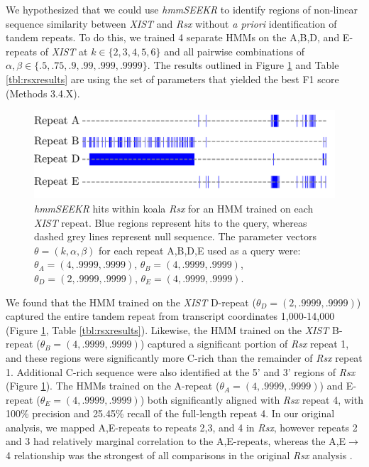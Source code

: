 We hypothesized that we could use \emph{hmmSEEKR} to identify regions of non-linear sequence similarity between \emph{XIST} and \emph{Rsx} without \emph{a priori} identification of tandem repeats. To do this, we trained 4 separate HMMs on the A,B,D, and E-repeats of \emph{XIST} at $k\in\{2,3,4,5,6\}$ and all pairwise combinations of $\alpha,\beta \in \{.5,.75,.9,.99,.999,.9999\}$. The results outlined in Figure \ref{fig:koalarsxhmm} and Table \ref{tbl:rsxresults} are using the set of parameters that yielded the best F1 score (Methods 3.4.X). 


\begin{figure}[h!]
\centering
\includegraphics[width=\textwidth]{images/koalarsx.pdf}
\caption[HMM analysis of \emph{Rsx}]{\emph{hmmSEEKR} hits within koala \emph{Rsx} for an HMM trained on each \emph{XIST} repeat. Blue regions represent hits to the query, whereas dashed grey lines represent null sequence. The parameter vectors $\theta = (k,\alpha,\beta)$ for each repeat A,B,D,E used as a query were: $\theta_A = (4,.9999,.9999)$, $\theta_B = (4,.9999,.9999)$, $\theta_D = (2,.9999,.9999)$, $\theta_E = (4,.9999,.9999)$.}
\label{fig:koalarsxhmm}
\end{figure}

We found that the HMM trained on the \emph{XIST} D-repeat ($\theta_D = (2,.9999,.9999)$)  captured the entire tandem repeat from transcript coordinates 1,000-14,000 (Figure \ref{fig:koalarsxhmm}, Table \ref{tbl:rsxresults}). Likewise, the HMM trained on the \emph{XIST} B-repeat ($\theta_B = (4,.9999,.9999)$) captured a significant portion of \emph{Rsx} repeat 1, and these regions were significantly more C-rich than the remainder of \emph{Rsx} repeat 1. Additional C-rich sequence were also identified at the 5' and 3' regions of \emph{Rsx} (Figure \ref{fig:koalarsxhmm}). The HMMs trained on the A-repeat ($\theta_A = (4,.9999,.9999)$) and E-repeat ($\theta_E = (4,.9999,.9999)$) both significantly aligned with \emph{Rsx} repeat 4, with 100\% precision and 25.45\% recall of the full-length repeat 4. In our original analysis, we mapped A,E-repeats to repeats 2,3, and 4 in \emph{Rsx}, however repeats 2 and 3 had relatively marginal correlation to the A,E-repeats, whereas the A,E$\rightarrow$4 relationship was the strongest of all comparisons in the original \emph{Rsx} analysis \cite{Sprague2019NonlinearDomains}. 

